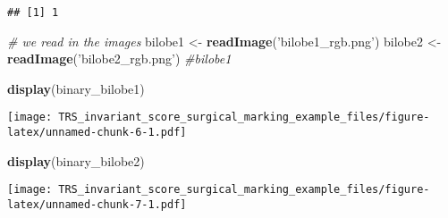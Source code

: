 \documentclass[
]{article}
\newenvironment{Shaded}{\begin{snugshade}}{\end{snugshade}}
\newcommand{\CommentTok}[1]{\textcolor[rgb]{0.56,0.35,0.01}{\textit{#1}}}
\newcommand{\DataTypeTok}[1]{\textcolor[rgb]{0.13,0.29,0.53}{#1}}
\newcommand{\FloatTok}[1]{\textcolor[rgb]{0.00,0.00,0.81}{#1}}
\newcommand{\KeywordTok}[1]{\textcolor[rgb]{0.13,0.29,0.53}{\textbf{#1}}}
\newcommand{\NormalTok}[1]{#1}
\newcommand{\OperatorTok}[1]{\textcolor[rgb]{0.81,0.36,0.00}{\textbf{#1}}}
\newcommand{\StringTok}[1]{\textcolor[rgb]{0.31,0.60,0.02}{#1}}
\begin{document}
\begin{verbatim}
## [1] 1
\end{verbatim}

\begin{Shaded}
\begin{Highlighting}[]
\CommentTok{# we read in the images}
\NormalTok{bilobe1 <-}\StringTok{ }\KeywordTok{readImage}\NormalTok{(}\StringTok{'bilobe1_rgb.png'}\NormalTok{)}
\NormalTok{bilobe2 <-}\StringTok{ }\KeywordTok{readImage}\NormalTok{(}\StringTok{'bilobe2_rgb.png'}\NormalTok{)}
\CommentTok{#bilobe1}
\end{Highlighting}
\end{Shaded}

\begin{Shaded}
\end{Shaded}

\begin{Shaded}
\begin{Highlighting}[]
\KeywordTok{display}\NormalTok{(binary_bilobe1)}
\end{Highlighting}
\end{Shaded}

\texttt{[image: TRS\_invariant\_score\_surgical\_marking\_example\_files/figure-latex/unnamed-chunk-6-1.pdf]}

\begin{Shaded}
\begin{Highlighting}[]
\KeywordTok{display}\NormalTok{(binary_bilobe2)}
\end{Highlighting}
\end{Shaded}

\texttt{[image: TRS\_invariant\_score\_surgical\_marking\_example\_files/figure-latex/unnamed-chunk-7-1.pdf]}
\end{document}
